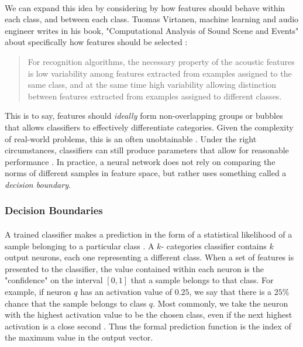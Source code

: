\documentclass[12pt,letterpaper]{article}
\begin{document}
\paragraph*{}We can expand this idea by considering by how features should behave within each class, and between each class. Tuomas Virtanen, machine learning and audio engineer writes in his book, "Computational Analysis of Sound Scene and Events" about specifically how features should be selected \cite{Virtanen}:
\begin{quote}
For recognition algorithms, the necessary property of the acoustic features is low variability among features extracted from examples assigned to the same class, and at the same time high variability allowing distinction between features extracted from examples assigned to different classes.
\end{quote}
This is to say, features should \textit{ideally} form non-overlapping groups or bubbles that allows classifiers to effectively differentiate categories. Given the complexity of real-world problems, this is an often unobtainable \cite{Goodfellow,James}. Under the right circumstances, classifiers can still produce parameters that allow for reasonable performance \cite{Geron,Loy}. In practice, a neural network does not rely on comparing the norms of different samples in feature space, but rather uses something called a \textit{decision boundary}.

\subsubsection{Decision Boundaries}
\label{subsubsec-Decision}

\paragraph*{}A trained classifier makes a prediction in the form of a statistical likelihood of a sample belonging to a particular class \cite{Goodfellow,James}. A $k$- categories classifier contains $k$ output neurons, each one representing a different class. When a set of features is presented to the classifier, the value contained within each neuron is the "confidence" on the interval $[0,1]$ that a sample belongs to that class. For example, if neuron $q$ has an activation value of $0.25$, we say that there is a $25\%$ chance that the sample belongs to class $q$. Most commonly, we take the neuron with the highest activation value to be the chosen class, even if the next highest activation is a close second \cite{Loy}. Thus the formal prediction function is the index of the maximum value in the output vector.
\end{document}
